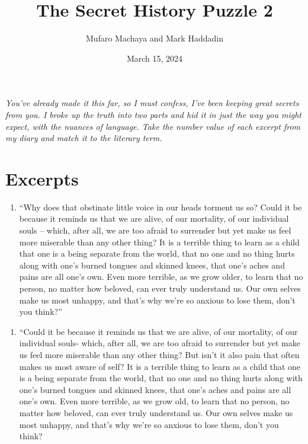\documentclass[11pt]{article}
\title{The Secret History Puzzle 2}
\author{Mufaro Machaya and Mark Haddadin}
\date{March 15, 2024}
\begin{document}
\begin{titlingpage}
\maketitle
\end{titlingpage}

\textit{You've already made it this far, so I must confess, I've been keeping great secrets from you. I broke up the truth into two parts and hid it in just the way you might expect, with the nuances of language. Take the number value of each excerpt from my diary and match it to the literary term.} \\

\section{Excerpts}

\begin{minipage}{\textwidth}
\begin{enumerate}[series=main]
  \item “Why does that obstinate little voice in our heads torment us so? Could it be because it reminds us that we are alive, of our mortality, of our individual souls – which, after all, we are too afraid to surrender but yet make us feel more miserable than any other thing? It is a terrible thing to learn as a child that one is a being separate from the world, that no one and no thing hurts along with one’s burned tongues and skinned knees, that one’s aches and pains are all one’s own. Even more terrible, as we grow older, to learn that no person, no matter how beloved, can ever truly understand us. Our own selves make us most unhappy, and that’s why we’re so anxious to lose them, don’t you think?” \\
\end{enumerate}
\end{minipage}

\begin{minipage}{\textwidth}
\begin{enumerate}[resume=main]
  \item “Could it be because it reminds us that we are alive, of our mortality, of our individual souls- which, after all, we are too afraid to surrender but yet make us feel more miserable than any other thing? But isn't it also pain that often makes us most aware of self? It is a terrible thing to learn as a child that one is a being separate from the world, that no one and no thing hurts along with one's burned tongues and skinned knees, that one's aches and pains are all one’s own. Even more terrible, as we grow old, to learn that no person, no matter how beloved, can ever truly understand us. Our own selves make us most unhappy, and that's why we're so anxious to lose them, don't you think? \\
\end{enumerate}
\end{minipage}
\end{document}
